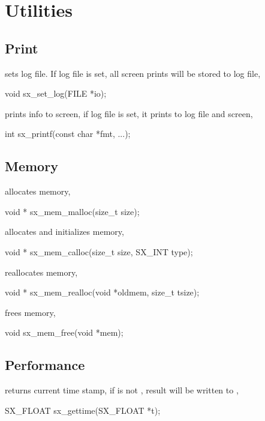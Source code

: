 \chapter{Utilities}

\section{Print}

 sets log file. If log file is set, all screen prints will be stored to log file,
\begin{evb}
void sx_set_log(FILE *io);
\end{evb}

 prints info to screen, if log file is set, it prints to log file and screen,
\begin{evb}
int sx_printf(const char *fmt, ...);
\end{evb}

\section{Memory}

 allocates memory,
\begin{evb}
void * sx_mem_malloc(size_t size);
\end{evb}

 allocates and initializes memory,
\begin{evb}
void * sx_mem_calloc(size_t size, SX_INT type);
\end{evb}

 reallocates memory,
\begin{evb}
void * sx_mem_realloc(void *oldmem, size_t tsize);
\end{evb}

 frees memory,
\begin{evb}
void sx_mem_free(void *mem);
\end{evb}

\section{Performance}

 returns current time stamp, if  is not , 
result will be written to ,
\begin{evb}
SX_FLOAT sx_gettime(SX_FLOAT *t);
\end{evb}
